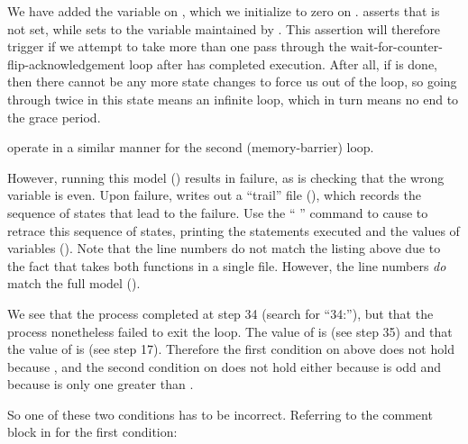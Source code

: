 \begin{fcvref}
We have added the  variable on ,
which we initialize to zero on .
 asserts that  is not set, while
 sets  to the 
variable maintained by .
This assertion will therefore trigger if we attempt to take more than
one pass through the wait-for-counter-flip-acknowledgement
loop after  has completed
execution.
After all, if  is done, then there cannot be
any more state changes to force us out of the loop, so going through twice
in this state means an infinite loop, which in turn means no end to the
grace period.

 operate in a similar manner
for the second (memory-barrier) loop.

However, running this
model ()
results in failure, as  is checking that
the wrong variable
is even.
Upon failure,  writes out a
``trail'' file
(),
which records the sequence of states that lead to the failure.
Use the ``%
''
command to cause  to retrace this sequence of states,
printing the statements executed and the values of variables
().
Note that the line numbers do not match the listing above due to
the fact that  takes both functions in a single file.
However, the line numbers \emph{do} match the full
model ().

We see that the  process completed
at step 34 (search for ``34:''), but that the
 process nonetheless failed to exit the loop.
The value of  is  (see step 35)
and that the value of  is  (see step 17).
Therefore the first condition on  above
does not hold because
, and the second condition on 
does not hold either because  is odd and because
 is only one greater than .
\end{fcvref}

So one of these two conditions has to be incorrect.
Referring to the comment block in 
for the first condition:

